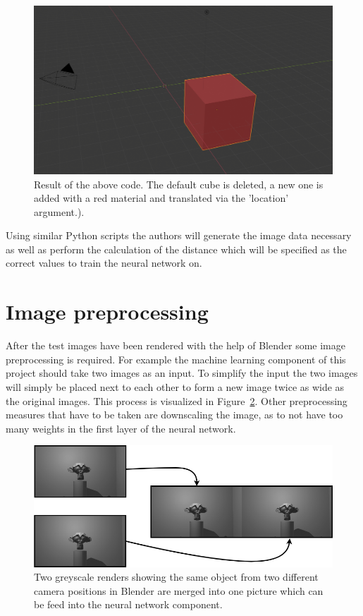 \begin{figure}[h!]
	\centering
	\includegraphics[width=6.5in]{img/methodology_generatingData_blender_exampleScriptResult.png}
	\caption{Result of the above code. The default cube is deleted, a new one is added with a red material and translated via the 'location' argument.).}
	\label{pic:methodology_generatingData_blender_exampleScriptResult}
\end{figure}

Using similar Python scripts the authors will generate the image data necessary as well as perform the calculation of the distance which will be specified as the correct values to train the neural network on.

\section{Image preprocessing}
After the test images have been rendered with the help of Blender some image preprocessing is required. For example the machine learning component of this project should take two images as an input. To simplify the input the two images will simply be placed next to each other to form a new image twice as wide as the original images. This process is visualized in Figure~\ref{pic:methodology_imagePreprocessing_imageMerge}. Other preprocessing measures that have to be taken are downscaling the image, as to not have too many weights in the first layer of the neural network.

\begin{figure}[h!]
	\centering
	\includegraphics[width=6.5in]{img/methodology_imagePreprocessing_imageMerge.png}
	\caption{Two greyscale renders showing the same object from two different camera positions in Blender are merged into one picture which can be feed into the neural network component.}
	\label{pic:methodology_imagePreprocessing_imageMerge}
\end{figure}


